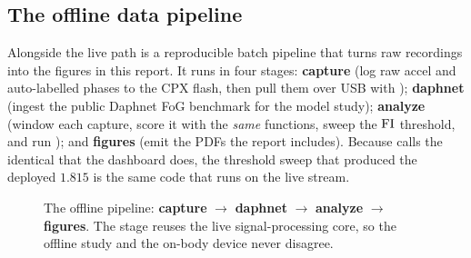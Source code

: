 \subsection{The offline data pipeline}

Alongside the live path is a reproducible batch pipeline that turns raw recordings into
the figures in this report. It runs in four stages: \textbf{capture} (log raw accel and
auto-labelled phases to the CPX flash, then pull them over USB with );
\textbf{daphnet} (ingest the public Daphnet FoG benchmark for the model study);
\textbf{analyze} (window each capture, score it with the \emph{same} 
functions, sweep the $\mathrm{FI}$ threshold, and run ); and \textbf{figures}
(emit the PDFs the report includes). Because  calls the identical 
that the dashboard does, the threshold sweep that produced the deployed $1.815$ is the
same code that runs on the live stream.

\begin{figure}[H]
\centering
{}
\caption{The offline pipeline: \textbf{capture} $\to$ \textbf{daphnet} $\to$
\textbf{analyze} $\to$ \textbf{figures}. The  stage reuses the live
signal-processing core, so the offline study and the on-body device never disagree.}
\label{fig:pipeline}
\end{figure}

